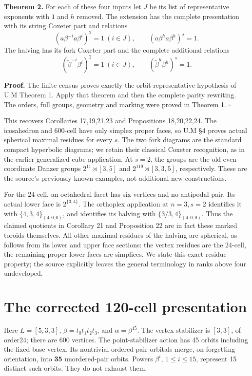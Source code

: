 \textbf{Theorem 2.} For each of these four inputs let \(J\) be its list of representative exponents with \(1\) and \(h\) removed. The extension has the complete presentation with its string Coxeter part and relations
\[
 (a\beta^{-i}a\beta^i)^2=1\ (i\in J),\qquad
 (a\beta^h a\beta^h)^s=1.                    \tag{7}
\]
The halving has its fork Coxeter part and the complete additional relations
\[
 (\widetilde\beta^{-i}\beta^i)^2=1\ (i\in J),\qquad
 (\widetilde\beta^h\beta^h)^s=1.             \tag{8}
\]

\textbf{Proof.} The finite census proves exactly the orbit-representative hypothesis of U.M Theorem 1. Apply that theorem and then the complete parity rewriting. The orders, full groups, geometry and marking were proved in Theorem 1. $\square$

This recovers Corollaries 17,19,21,23 and Propositions 18,20,22,24. The icosahedron and 600-cell have only simplex proper faces, so U.M §4 proves actual spherical maximal residues for every \(s\). The two fork diagrams are the standard compact hyperbolic diagrams; we retain their classical Coxeter recognition, as in the earlier generalized-cube application. At \(s=2\), the groups are the old even-coordinate Danzer groups \(2^{11}\rtimes[3,5]\) and \(2^{119}\rtimes[3,3,5]\), respectively. These are the source's previously known examples, not additional new constructions.

For the 24-cell, an octahedral facet has six vertices and no antipodal pair. Its actual lower face is \(2^{\{3,4\}}\). The orthoplex application at \(n=3,s=2\) identifies it with \(\{4,3,4\}_{(4,0,0)}\), and identifies its halving with \(\{3/3,4\}_{(4,0,0)}\). Thus the claimed quotients in Corollary 21 and Proposition 22 are in fact these marked toroids themselves. All other maximal residues of the halving are spherical, as follows from its lower and upper face sections: the vertex residues are the 24-cell, the remaining proper lower faces are simplices. We state this exact residue property; the source explicitly leaves the general terminology in ranks above four undeveloped.

\section{The corrected 120-cell presentation}\label{the-corrected-120-cell-presentation}

Here \(L=[5,3,3]\), \(\beta=t_0t_1t_2t_3\), and \(\alpha=\beta^{15}\). The vertex stabilizer is \([3,3]\), of order24; there are 600 vertices. The point-stabilizer action has 45 orbits including the fixed base vertex. Its nontrivial ordered-pair orbitals merge, on forgetting orientation, into \textbf{35} unordered-pair orbits. Powers \(\beta^i\), \(1\le i\le15\), represent 15 distinct such orbits. They do not exhaust them.

